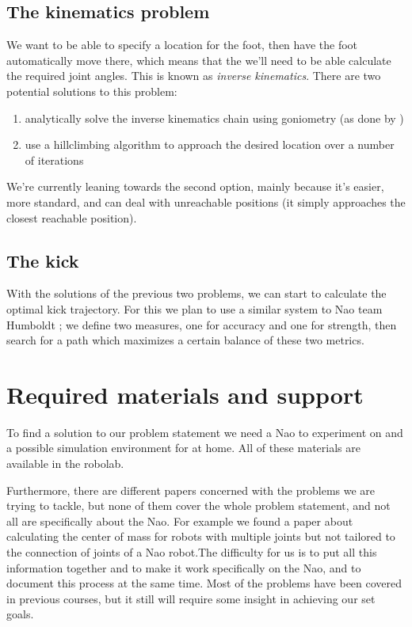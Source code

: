 \documentclass[a4paper]{article}
\begin{document}
\subsection{The kinematics problem}
We want to be able to specify a location for the foot, then have the foot
automatically move there, which means that the we'll need to be able calculate
the required joint angles. This is known as \emph{inverse kinematics}. There are
two potential solutions to this problem:
\begin{enumerate}
  \item analytically solve the inverse kinematics chain using goniometry (as done by \cite{Graf2009})
\item use a hillclimbing algorithm to approach the desired location over a number of iterations
\end{enumerate}

We're currently leaning towards the second option, mainly because it’s easier,
more standard, and can deal with unreachable positions (it simply approaches the
closest reachable position).

\subsection{The kick}
With the solutions of the previous two problems, we can start to calculate the
optimal kick trajectory. For this we plan to use a similar system to Nao team
Humboldt \cite{Muller2011}; we define two measures, one for accuracy and one for
strength, then search for a path which maximizes a certain balance of these two
metrics. 

\section{Required materials and support} 
To find a solution to our problem statement we need a Nao to experiment on and a
possible simulation environment for at home. All of these materials are
available in the robolab.

Furthermore, there are different papers concerned with the problems we are
trying to tackle, but none of them cover the whole problem statement, and not
all are specifically about the Nao. For example we found a paper about
calculating the center of mass for robots with multiple joints\cite{Cotton2008} but not tailored
to the connection of joints of a  Nao robot.The difficulty for us is to put all this
information together and to make it work specifically on the Nao, and to
document this process at the same time. Most of the problems have been covered
in previous courses, but it still will require some insight in achieving our set
goals.
\end{document}
